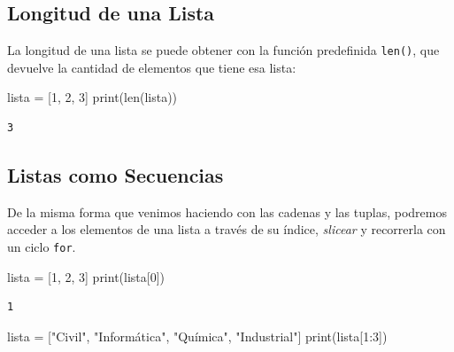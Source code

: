 \documentclass[
  letterpaper,
  DIV=11,
  numbers=noendperiod]{scrreprt}
\newenvironment{Shaded}{\begin{snugshade}}{\end{snugshade}}
\newcommand{\BuiltInTok}[1]{\textcolor[rgb]{0.00,0.23,0.31}{#1}}
\newcommand{\DecValTok}[1]{\textcolor[rgb]{0.68,0.00,0.00}{#1}}
\newcommand{\NormalTok}[1]{\textcolor[rgb]{0.00,0.23,0.31}{#1}}
\newcommand{\OperatorTok}[1]{\textcolor[rgb]{0.37,0.37,0.37}{#1}}
\newcommand{\StringTok}[1]{\textcolor[rgb]{0.13,0.47,0.30}{#1}}
\begin{document}
\hypertarget{longitud-de-una-lista}{%
\subsection{Longitud de una Lista}\label{longitud-de-una-lista}}

La longitud de una lista se puede obtener con la función predefinida
\texttt{len()}, que devuelve la cantidad de elementos que tiene esa
lista:

\begin{Shaded}
\begin{Highlighting}[]
\NormalTok{lista }\OperatorTok{=}\NormalTok{ [}\DecValTok{1}\NormalTok{, }\DecValTok{2}\NormalTok{, }\DecValTok{3}\NormalTok{]}
\BuiltInTok{print}\NormalTok{(}\BuiltInTok{len}\NormalTok{(lista))}
\end{Highlighting}
\end{Shaded}

\begin{verbatim}
3
\end{verbatim}

\hypertarget{listas-como-secuencias}{%
\subsection{Listas como Secuencias}\label{listas-como-secuencias}}

De la misma forma que venimos haciendo con las cadenas y las tuplas,
podremos acceder a los elementos de una lista a través de su índice,
\emph{slicear} y recorrerla con un ciclo \texttt{for}.

\begin{Shaded}
\begin{Highlighting}[]
\NormalTok{lista }\OperatorTok{=}\NormalTok{ [}\DecValTok{1}\NormalTok{, }\DecValTok{2}\NormalTok{, }\DecValTok{3}\NormalTok{]}
\BuiltInTok{print}\NormalTok{(lista[}\DecValTok{0}\NormalTok{])}
\end{Highlighting}
\end{Shaded}

\begin{verbatim}
1
\end{verbatim}

\begin{Shaded}
\begin{Highlighting}[]
\NormalTok{lista }\OperatorTok{=}\NormalTok{ [}\StringTok{"Civil"}\NormalTok{, }\StringTok{"Informática"}\NormalTok{, }\StringTok{"Química"}\NormalTok{, }\StringTok{"Industrial"}\NormalTok{]}
\BuiltInTok{print}\NormalTok{(lista[}\DecValTok{1}\NormalTok{:}\DecValTok{3}\NormalTok{])}
\end{Highlighting}
\end{Shaded}
\end{document}

